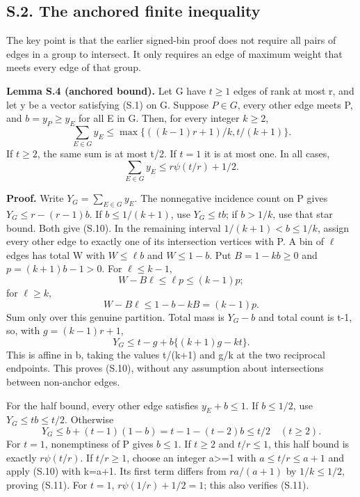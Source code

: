 \documentclass[
  11pt,
]{article}
\begin{document}
\subsection{S.2. The anchored finite
inequality}\label{s.2.-the-anchored-finite-inequality}

The key point is that the earlier signed-bin proof does not require all
pairs of edges in a group to intersect. It only requires an edge of
maximum weight that meets every edge of that group.

\textbf{Lemma S.4 (anchored bound).} Let G have \(t\ge1\) edges of rank
at most r, and let y be a vector satisfying (S.1) on G. Suppose
\(P\in G\), every other edge meets P, and \(b=y_P\ge y_E\) for all E in
G. Then, for every integer \(k\ge2\), \[
 \sum_{E\in G}y_E\le
       \max\{((k-1)r+1)/k,t/(k+1)\}.                      \tag{S.10}
\] If \(t\ge2\), the same sum is at most t/2. If \(t=1\) it is at most
one. In all cases, \[
              \sum_{E\in G}y_E\le r\psi(t/r)+1/2.          \tag{S.11}
\]

\textbf{Proof.} Write \(Y_G=\sum_{E\in G}y_E\). The nonnegative
incidence count on P gives \(Y_G\le r-(r-1)b\). If \(b\le1/(k+1)\), use
\(Y_G\le tb\); if \(b>1/k\), use that star bound. Both give (S.10). In
the remaining interval \(1/(k+1)<b\le1/k\), assign every other edge to
exactly one of its intersection vertices with P. A bin of \(\ell\) edges
has total W with \(W\le\ell b\) and \(W\le1-b\). Put \(B=1-kb\ge0\) and
\(p=(k+1)b-1>0\). For \(\ell\le k-1\), \[
          W-B\ell\le\ell p\le(k-1)p;
\] for \(\ell\ge k\), \[
          W-B\ell\le1-b-kB=(k-1)p.
\] Sum only over this genuine partition. Total mass is \(Y_G-b\) and
total count is t-1, so, with \(g=(k-1)r+1\), \[
            Y_G\le t-g+b\{(k+1)g-kt\}.
\] This is affine in b, taking the values t/(k+1) and g/k at the two
reciprocal endpoints. This proves (S.10), without any assumption about
intersections between non-anchor edges.

For the half bound, every other edge satisfies \(y_E+b\le1\). If
\(b\le1/2\), use \(Y_G\le tb\le t/2\). Otherwise \[
          Y_G\le b+(t-1)(1-b)
                    =t-1-(t-2)b\le t/2\quad(t\ge2).
\] For \(t=1\), nonemptiness of P gives \(b\le1\). If \(t\ge2\) and
\(t/r\le1\), this half bound is exactly \(r\psi(t/r)\). If \(t/r\ge1\),
choose an integer a\textgreater=1 with \(a\le t/r\le a+1\) and apply
(S.10) with k=a+1. Its first term differs from \(r a/(a+1)\) by
\(1/k\le1/2\), proving (S.11). For \(t=1\), \(r\psi(1/r)+1/2=1\); this
also verifies (S.11).
\end{document}
